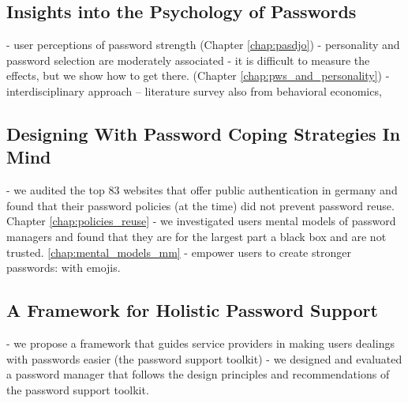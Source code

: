 \subsection{Insights into the Psychology of Passwords}
- user perceptions of password strength (Chapter \ref{chap:pasdjo})
- personality and password selection are moderately associated
- it is difficult to measure the effects, but we show how to get there. (Chapter \ref{chap:pws_and_personality})
- interdisciplinary approach -- literature survey also from behavioral economics, 

\subsection{Designing With Password Coping Strategies In Mind}
- we audited the top 83 websites that offer public authentication in germany and found that their password policies (at the time) did not prevent password reuse. Chapter \ref{chap:policies_reuse}
- we investigated users mental models of password managers and found that they are for the largest part a black box and are not trusted. \ref{chap:mental_models_mm}
- empower users to create stronger passwords: with emojis. 


\subsection{A Framework for Holistic Password Support}
- we propose a framework that guides service providers in making users dealings with passwords easier (the password support toolkit)
- we designed and evaluated a password manager that follows the design principles and recommendations of the password support toolkit. 

